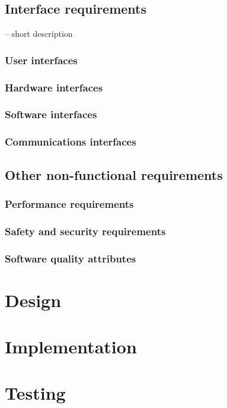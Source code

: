 \subsection{Interface requirements}
-- short description

\subsubsection{User interfaces}

\subsubsection{Hardware interfaces}

\subsubsection{Software interfaces}

\subsubsection{Communications interfaces}

\subsection{Other non-functional requirements}

\subsubsection{Performance requirements}

\subsubsection{Safety and security requirements}

\subsubsection{Software quality attributes}




\section{Design}

\section{Implementation}

\section{Testing}